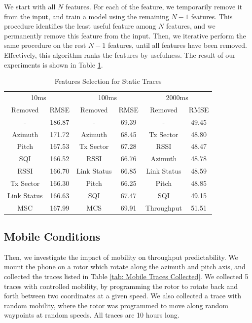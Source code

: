 \documentclass[sigconf,anonymous]{acmart}
\begin{document}
We start with all $N$ features. For each of the feature, we temporarily remove it from the input, and train a model using the remaining $N-1$ features. This procedure identifies the least useful feature among $N$ features, and we permanently remove this feature from the input. Then, we iterative perform the same procedure on the rest $N-1$ features, until all features have been removed. Effectively, this algorithm ranks the features by usefulness. The result of our experiments is shown in Table \ref{tab: Static Feature Selection}.

\begin{table}[h]
\caption{Features Selection for Static Traces}
\label{tab: Static Feature Selection}
\begin{tabular}{c c|c c|c c}
\toprule
\multicolumn{2}{c|}{10ms} & \multicolumn{2}{c|}{100ms} & \multicolumn{2}{c}{2000ms} \\
Removed & RMSE & Removed & RMSE & Removed & RMSE \\
\midrule
- & 186.87 & - & 69.39 & - & 49.45 \\
Azimuth & 171.72 & Azimuth & 68.45 & Tx Sector & 48.80 \\
Pitch & 167.53 & Tx Sector & 67.28 & RSSI & 48.47 \\
SQI & 166.52 & RSSI & 66.76 & Azimuth & 48.78 \\
RSSI & 166.70 & Link Status & 66.85 & Link Status & 48.59 \\
Tx Sector & 166.30 & Pitch & 66.25 & Pitch & 48.85 \\
Link Status & 166.63 & SQI & 67.47 & SQI & 49.15 \\
MSC & 167.99 & MCS & 69.91 & Throughput & 51.51 \\
\bottomrule
\end{tabular}
\end{table}


\subsection{Mobile Conditions}

Then, we investigate the impact of mobility on throughput predictability. We mount the phone on a rotor which rotate along the azimuth and pitch axis, and collected the traces listed in Table \ref{tab: Mobile Traces Collected}. We collected 5 traces with controlled mobility, by programming the rotor to rotate back and forth between two coordinates at a given speed. We also collected a trace with random mobility, where the rotor was programmed to move along random waypoints at random speeds. All traces are 10 hours long.
\end{document}
